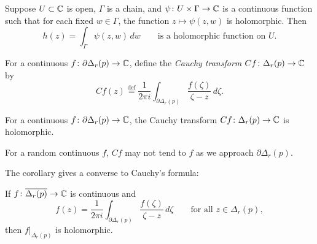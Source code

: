 \documentclass[10pt,aspectratio=169]{beamer}
\begin{document}
\begin{frame}
\begin{corollary}
Suppose $U \subset {\mathbb{C}}$ is open, $\Gamma$ is a 
chain,
and
$\psi \colon U \times \Gamma \to {\mathbb{C}}$ is a continuous function such that
for each fixed $w \in \Gamma$, the function $z \mapsto \psi(z,w)$ is
holomorphic.  Then
\[
h(z) =
\int_\Gamma \psi(z,w) \, dw
\qquad \text{is a holomorphic function on } U.
\]
\end{corollary}
\pause

For a continuous $f \colon \partial \Delta_r(p) \to {\mathbb{C}}$, define
the \emph{Cauchy transform} $Cf \colon \Delta_r(p) \to {\mathbb{C}}$ by
\begin{equation*}
Cf(z)
\overset{\text{def}}{=}
\frac{1}{2\pi i}
\int_{\partial \Delta_r(p)}
\frac{f(\zeta)}{\zeta-z}\, d\zeta .
\end{equation*}
\pause

\begin{corollary}
For a continuous $f \colon \partial \Delta_r(p) \to {\mathbb{C}}$,
the Cauchy transform $Cf \colon \Delta_r(p) \to {\mathbb{C}}$ is holomorphic.
\end{corollary}

\pause

For a random continuous $f$, $Cf$ may not tend to $f$ as we approach
$\partial \Delta_r(p)$.
\end{frame}

\begin{frame}
The corollary gives a converse to Cauchy's formula:

\medskip
\pause

If $f \colon \overline{\Delta_r(p)} \to {\mathbb{C}}$ is continuous and
\begin{equation*}
f(z) =
\frac{1}{2\pi i}
\int_{\partial \Delta_r(p)} \frac{f(\zeta)}{\zeta-z} \, d\zeta
\qquad \text{for all } z \in \Delta_r(p),
\end{equation*}
\pause
then $f|_{\Delta_r(p)}$ is holomorphic.

\end{frame}
\end{document}
